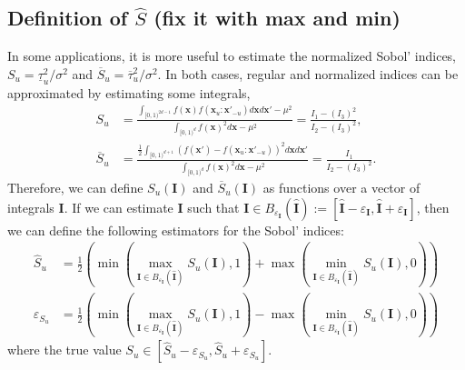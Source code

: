 \documentclass[]{elsarticle}
\theoremstyle{definition}
\newcommand{\bvec}[1]{\boldsymbol{#1}}
\newcommand{\vx}{\bvec{x}}
\newcommand{\vI}{\bvec{I}}
\begin{document}
\subsection{Definition of $\widehat{S}$ (fix it with max and min)}
In some applications, it is more useful to estimate the normalized Sobol' indices, $S_u = \underline{\tau}_u^2/\sigma^2$ and $\overline{S}_u = \overline{\tau}_u^2/\sigma^2$. In both cases, regular and normalized indices can be approximated by estimating some integrals,
\begin{align*}
S_u & = \frac{\int_{[0,1)^{2d-1}} f(\vx)f(\vx_{u}:{\vx'}_{-u})d\vx d{\vx'} - \mu^2 }{\int_{[0,1)^{d}} f(\vx)^2 d{\vx}-\mu^2} = \frac{I_1-(I_3)^2}{I_2-(I_3)^2}, \\
\overline{S}_u & = \frac{\frac{1}{2}\int_{[0,1)^{d+1}}(f(\vx')-f(\vx_u:{\vx'}_{-u}))^2d\vx d{\vx'}}{\int_{[0,1)^{d}} f(\vx)^2 d{\vx}-\mu^2} = \frac{I_1}{I_2-(I_3)^2}.
\end{align*}
Therefore, we can define $S_u(\vI)$ and $\overline{S}_u(\vI)$ as functions over a vector of integrals $\vI$. If we can estimate $\vI$ such that $\vI\in B_{\varepsilon_{\vI}}(\widehat{\vI}):=[\widehat{\vI}-\varepsilon_{\vI},\widehat{\vI}+\varepsilon_{\vI} ]$, then we can define the following estimators for the Sobol' indices:
\begin{align*}
\widehat{S}_u & = \frac{1}{2}\left(\min\left(\max_{\vI\in B_{\varepsilon_{\vI}}(\widehat{\vI})} S_u(\vI),1\right) + \max\left(\min_{\vI\in B_{\varepsilon_{\vI}}(\widehat{\vI})} S_u(\vI),0\right) \right) \\
\varepsilon_{S_u} & = \frac{1}{2}\left(\min\left(\max_{\vI\in B_{\varepsilon_{\vI}}(\widehat{\vI})} S_u(\vI),1\right) - \max\left(\min_{\vI\in B_{\varepsilon_{\vI}}(\widehat{\vI})} S_u(\vI),0\right) \right)
\end{align*}
where the true value $S_u\in [\widehat{S}_u - \varepsilon_{S_u}, \widehat{S}_u + \varepsilon_{S_u}]$.
\end{document}
